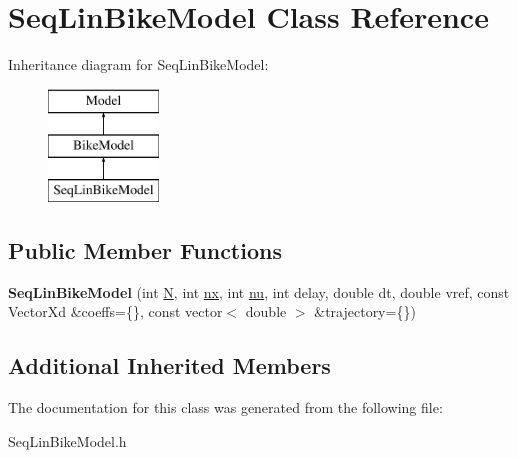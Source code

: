 \hypertarget{classSeqLinBikeModel}{}\section{Seq\+Lin\+Bike\+Model Class Reference}
\label{classSeqLinBikeModel}
Inheritance diagram for Seq\+Lin\+Bike\+Model\+:\begin{figure}[H]
\begin{center}
\leavevmode
\includegraphics[height=3.000000cm]{classSeqLinBikeModel}
\end{center}
\end{figure}
\subsection*{Public Member Functions}
\begin{DoxyCompactItemize}
\item 
\mbox{\label{classSeqLinBikeModel_aa5bf30cdbdbdc0cecbd241403fa4ef8b}} 
{\bfseries Seq\+Lin\+Bike\+Model} (int \mbox{\hyperlink{classModel_aca776f8a10906afa8a5c362034727921}{N}}, int \mbox{\hyperlink{classModel_a951f42de158e872b5affece79521b968}{nx}}, int \mbox{\hyperlink{classModel_a0afbb992dab28ae89f1b0b114d65689c}{nu}}, int delay, double dt, double vref, const Vector\+Xd \&coeffs=\{\}, const vector$<$ double $>$ \&trajectory=\{\})
\end{DoxyCompactItemize}
\subsection*{Additional Inherited Members}


The documentation for this class was generated from the following file\+:\begin{DoxyCompactItemize}
\item 
Seq\+Lin\+Bike\+Model.\+h\end{DoxyCompactItemize}
